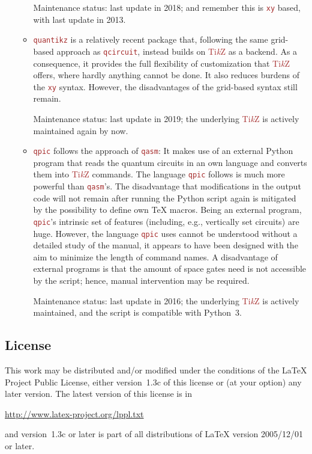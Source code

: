 \documentclass{scrartcl}
\def\TikZ{\textcolor{brown}{Ti\textit kZ}}
\def\pkg#1{\textcolor{brown}{\texttt{#1}}}
\begin{document}
\begin{itemize}
\begin{itemize}
                     Maintenance status: last update in 2018; and remember this is \pkg{xy} based, with last update in 2013.
                  \item \pkg{quantikz} is a relatively recent package that, following the same grid\hyp based approach as \pkg{qcircuit}, instead builds on \TikZ{} as a backend.
                     As a consequence, it provides the full flexibility of customization that \TikZ{} offers, where hardly anything cannot be done.
                     It also reduces burdens of the \pkg{xy} syntax.
                     However, the disadvantages of the grid\hyp based syntax still remain.
                     
                     Maintenance status: last update in 2019; the underlying \TikZ{} is actively maintained again by now.
                  \item \pkg{qpic} follows the approach of \pkg{qasm}: It makes use of an external Python program that reads the quantum circuits in an own language and converts them into \TikZ{} commands.
                     The language \pkg{qpic} follows is much more powerful than \pkg{qasm}'s.
                     The disadvantage that modifications in the output code will not remain after running the Python script again is mitigated by the possibility to define own \TeX{} macros.
                     Being an external program, \pkg{qpic}'s intrinsic set of features (including, e.g., vertically set circuits) are huge.
                     However, the language \pkg{qpic} uses cannot be understood without a detailed study of the manual, it appears to have been designed with the aim to minimize the length of command names.
                     A disadvantage of external programs is that the amount of space gates need is not accessible by the script; hence, manual intervention may be required.
                     
                     Maintenance status: last update in 2016; the underlying \TikZ{} is actively maintained, and the script is compatible with Python~3.
               \end{itemize}
         \end{itemize}
      
      \subsection{License}
          This work may be distributed and/or modified under the conditions of the \LaTeX{} Project Public License, either version~1.3c of this license or (at your option) any later version.
          The latest version of this license is in
          \begin{center}
             \url{http://www.latex-project.org/lppl.txt}
          \end{center}
          and version~1.3c or later is part of all distributions of LaTeX version 2005/12/01 or later.
   
\end{document}
